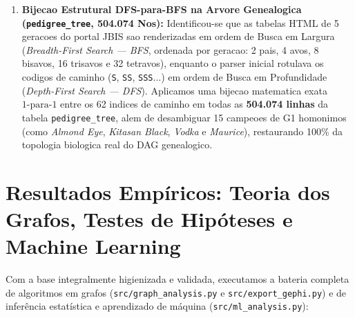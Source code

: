 \documentclass[12pt,a4paper]{article}
\begin{document}
\begin{enumerate}
    \item \textbf{Bijecao Estrutural DFS-para-BFS na Arvore Genealogica (\texttt{pedigree\_tree}, 504.074 Nos):} Identificou-se que as tabelas HTML de 5 geracoes do portal JBIS sao renderizadas em ordem de Busca em Largura (\textit{Breadth-First Search --- BFS}, ordenada por geracao: 2 pais, 4 avos, 8 bisavos, 16 trisavos e 32 tetravos), enquanto o parser inicial rotulava os codigos de caminho (\texttt{S}, \texttt{SS}, \texttt{SSS}...) em ordem de Busca em Profundidade (\textit{Depth-First Search --- DFS}). Aplicamos uma bijecao matematica exata $1\text{-para-}1$ entre os 62 indices de caminho em todas as \textbf{504.074 linhas} da tabela \texttt{pedigree\_tree}, alem de desambiguar 15 campeoes de G1 homonimos (como \textit{Almond Eye}, \textit{Kitasan Black}, \textit{Vodka} e \textit{Maurice}), restaurando 100\% da topologia biologica real do DAG genealogico.
\end{enumerate}

\section{Resultados Empíricos: Teoria dos Grafos, Testes de Hipóteses e Machine Learning}
Com a base integralmente higienizada e validada, executamos a bateria completa de algoritmos em grafos (\texttt{src/graph\_analysis.py} e \texttt{src/export\_gephi.py}) e de inferência estatística e aprendizado de máquina (\texttt{src/ml\_analysis.py}):
\end{document}
